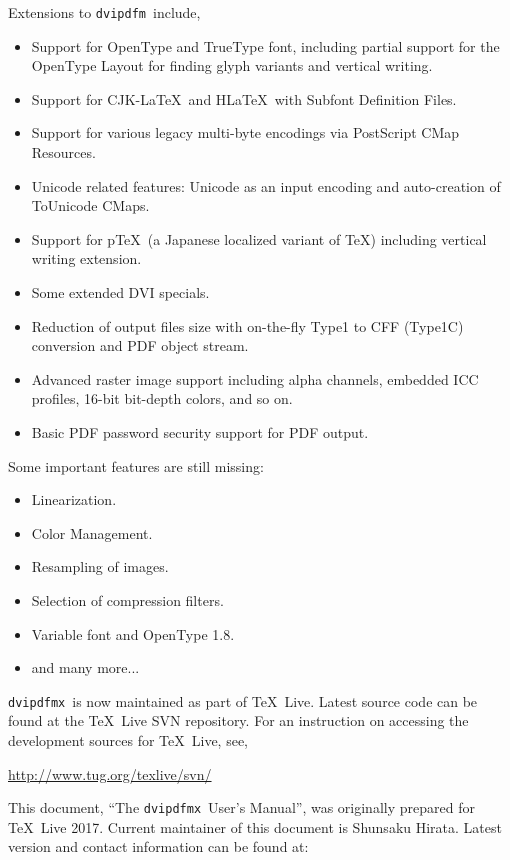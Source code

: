 \documentclass[a4paper,xetex,oneside]{book}
\newcommand{\dvipdfm}{\texttt{dvipdfm}}
\newcommand{\dvipdfmx}{\texttt{dvipdfmx}}
\begin{document}
Extensions to \dvipdfm\ include,
\begin{itemize}
    \item Support for OpenType and TrueType font, including partial support
    for the OpenType Layout for finding glyph variants and vertical writing.
    \item Support for CJK-\LaTeX\ and H\LaTeX\ with Subfont Definition Files.
    \item Support for various legacy multi-byte encodings via PostScript CMap
     Resources.
    \item Unicode related features: Unicode as an input encoding and
    auto-creation of ToUnicode CMaps.
    \item Support for p\TeX\ (a Japanese localized variant of \TeX) including
    vertical writing extension.
    \item Some extended DVI specials.
    \item Reduction of output files size with on-the-fly Type1 to CFF (Type1C)
    conversion and PDF object stream.
    \item Advanced raster image support including alpha channels, embedded
    ICC profiles, 16-bit bit-depth colors, and so on.
    \item Basic PDF password security support for PDF output.
\end{itemize}
Some important features are still missing:
\begin{itemize}
    \item Linearization.
    \item Color Management.
    \item Resampling of images.
    \item Selection of compression filters.
    \item Variable font and OpenType 1.8.
    \item and many more...
\end{itemize}

\dvipdfmx\ is now maintained as part of \TeX\ Live. Latest source code can
be found at the \TeX\ Live SVN repository. For an instruction on accessing the
development sources for \TeX\ Live, see,\medskip

\url{http://www.tug.org/texlive/svn/}
\medskip

This document, ``The \dvipdfmx\ User's Manual'', was originally prepared for
\TeX\ Live 2017. Current maintainer of this document is Shunsaku Hirata.
Latest version and contact information can be found at:\medskip
\end{document}
